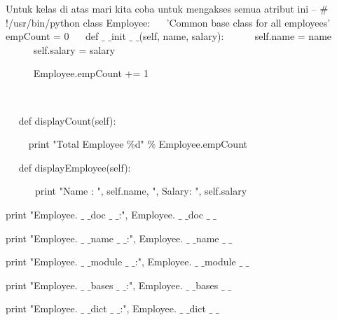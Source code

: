 {Untuk kelas di atas mari kita coba untuk mengakses semua atribut ini – 
\vspace{12pt}
\noindent 
 $  \#  $!/usr/bin/python 
\vspace{12pt}
\noindent 
class Employee: 
\noindent 
~~ 'Common base class for all employees' 
\noindent 
~~ empCount = 0 
\vspace{12pt}
\noindent 
~~ def  $  \_  $ $  \_  $init $  \_  $ $  \_  $(self, name, salary): 
\noindent 
~~~~~ self.name = name 
\noindent 
~~~~~ self.salary = salary \par
\noindent 
~~~~~ Employee.empCount += 1 \par
\noindent 
~~  \par
\noindent 
~~ def displayCount(self): \par
\noindent 
~~~~ print "Total Employee  $  \%  $d"  $  \%  $ Employee.empCount \par
\vspace{12pt}
\noindent 
~~ def displayEmployee(self): \par
\noindent 
~~~~~~print "Name : ", self.name,  ", Salary: ", self.salary \par
\vspace{12pt}
\noindent 
print "Employee. $  \_  $ $  \_  $doc $  \_  $ $  \_  $:", Employee. $  \_  $ $  \_  $doc $  \_  $ $  \_  $ \par
\noindent 
print "Employee. $  \_  $ $  \_  $name $  \_  $ $  \_  $:", Employee. $  \_  $ $  \_  $name $  \_  $ $  \_  $ \par
\noindent 
print "Employee. $  \_  $ $  \_  $module $  \_  $ $  \_  $:", Employee. $  \_  $ $  \_  $module $  \_  $ $  \_  $ \par
\noindent 
print "Employee. $  \_  $ $  \_  $bases $  \_  $ $  \_  $:", Employee. $  \_  $ $  \_  $bases $  \_  $ $  \_  $ \par
\noindent 
print "Employee. $  \_  $ $  \_  $dict $  \_  $ $  \_  $:", Employee. $  \_  $ $  \_  $dict $  \_  $ $  \_  $ \par
\vspace{12pt}
\vspace{12pt}
\noindent 

}
